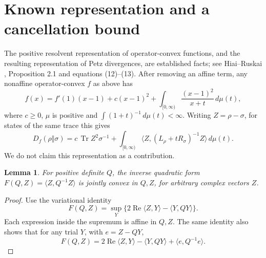 \documentclass[11pt]{article}
\newcommand{\Tr}{\operatorname{Tr}}
\newcommand{\ip}[2]{\langle #1,#2\rangle}
\newtheorem{lemma}[theorem]{Lemma}
\theoremstyle{remark}
\begin{document}
\section{Known representation and a cancellation bound}
The positive resolvent representation of operator-convex functions, and the resulting representation of Petz divergences, are established facts; see Hiai--Ruskai \cite{HR}, Proposition 2.1 and equations (12)--(13). After removing an affine term, any nonaffine operator-convex \(f\) as above has
\begin{equation}\label{eq:representation}
 f(x)=f'(1)(x-1)+c(x-1)^2+
 \int_{[0,\infty)}\frac{(x-1)^2}{x+t}\,d\mu(t),
\end{equation}
where \(c\ge0\), \(\mu\) is positive and
\(\int(1+t)^{-1}\,d\mu(t)<\infty\).
Writing \(Z=\rho-\sigma\), for states of the same trace this gives
\begin{equation}\label{eq:resolvent}
 D_f(\rho\Vert\sigma)=
 c\,\Tr Z^2\sigma^{-1}+
 \int_{[0,\infty)}
 \ip{Z}{(L_\rho+tR_\sigma)^{-1}Z}\,d\mu(t).
\end{equation}
We do not claim this representation as a contribution.

\begin{lemma}\label{lem:inverse}
For positive definite \(Q\), the inverse quadratic form
\(F(Q,Z)=\ip{Z}{Q^{-1}Z}\) is jointly convex in \(Q,Z\), for arbitrary complex vectors \(Z\).
\end{lemma}
\begin{proof}
Use the variational identity
\[
 F(Q,Z)=\sup_Y\{2\operatorname{Re}\ip{Z}{Y}-\ip{Y}{QY}\}.
\]
Each expression inside the supremum is affine in \(Q,Z\).
The same identity also shows that for any trial \(Y\), with \(e=Z-QY\),
\begin{equation}\label{eq:residual}
 F(Q,Z)=2\operatorname{Re}\ip{Z}{Y}-\ip{Y}{QY}
       +\ip{e}{Q^{-1}e}.
\end{equation}
\end{proof}
\end{document}
